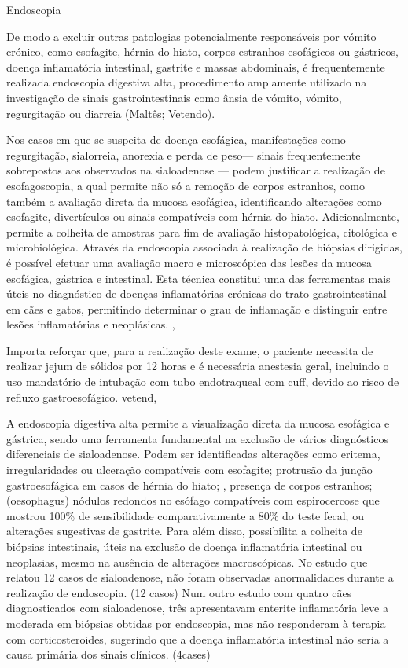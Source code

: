 Endoscopia 


De modo a excluir outras patologias potencialmente responsáveis por vómito crónico, como esofagite, hérnia do hiato, corpos estranhos esofágicos ou gástricos, doença inflamatória intestinal, gastrite e massas abdominais, é frequentemente realizada endoscopia digestiva alta, procedimento amplamente utilizado na investigação de sinais gastrointestinais como ânsia de vómito, vómito, regurgitação ou diarreia (Maltês; Vetendo).


Nos casos em que se suspeita de doença esofágica, manifestações como regurgitação, sialorreia, anorexia e perda de peso— sinais frequentemente sobrepostos aos observados na sialoadenose — podem justificar a realização de esofagoscopia, a qual permite não só a remoção de corpos estranhos, como também a avaliação direta da mucosa esofágica, identificando alterações como esofagite, divertículos ou sinais compatíveis com hérnia do hiato. \cite{Sum2009} Adicionalmente, permite a colheita de amostras para fim de avaliação histopatológica, citológica e microbiológica. \cite{applications} Através da endoscopia associada à realização de biópsias dirigidas, é possível efetuar uma avaliação macro e microscópica das lesões da mucosa esofágica, gástrica e intestinal. \cite{Rychlik2020} Esta técnica constitui uma das ferramentas mais úteis no diagnóstico de doenças inflamatórias crónicas do trato gastrointestinal em cães e gatos, permitindo determinar o grau de inflamação e distinguir entre lesões inflamatórias e neoplásicas. \cite{Rychlik2020},\cite{Jergens2016}


Importa reforçar que, para a realização deste exame, o paciente necessita de realizar jejum de sólidos por 12 horas e é necessária anestesia geral, incluindo o uso mandatório de intubação com tubo endotraqueal com cuff, devido ao risco de refluxo gastroesofágico. vetend,\cite{Bsavaendo}


A endoscopia digestiva alta permite a visualização direta da mucosa esofágica e gástrica, sendo uma ferramenta fundamental na exclusão de vários diagnósticos diferenciais de sialoadenose. \cite{Bsavaendo} Podem ser identificadas alterações como eritema, irregularidades ou ulceração compatíveis com esofagite;\cite{Bsavaendo} protrusão da junção gastroesofágica em casos de hérnia do hiato; \cite{Kim2021},\cite{Broux2018} presença de corpos estranhos;(oesophagus) nódulos redondos no esófago compatíveis com espirocercose que mostrou 100\% de sensibilidade comparativamente a 80\% do teste fecal;\cite{vander}\cite{file} ou alterações sugestivas de gastrite. Para além disso, possibilita a colheita de biópsias intestinais, úteis na exclusão de doença inflamatória intestinal ou neoplasias, mesmo na ausência de alterações macroscópicas. \cite{Cerquetella2010} No estudo que relatou 12 casos de sialoadenose, não foram observadas anormalidades durante a realização de endoscopia. (12 casos) Num outro estudo com quatro cães diagnosticados com sialoadenose, três apresentavam enterite inflamatória leve a moderada em biópsias obtidas por endoscopia, mas não responderam à terapia com corticosteroides, sugerindo que a doença inflamatória intestinal não seria a causa primária dos sinais clínicos. (4cases)


